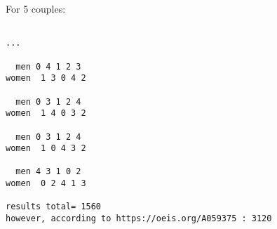 For 5 couples:

\begin{lstlisting}

...

  men 0 4 1 2 3
women  1 3 0 4 2

  men 0 3 1 2 4
women  1 4 0 3 2

  men 0 3 1 2 4
women  1 0 4 3 2

  men 4 3 1 0 2
women  0 2 4 1 3

results total= 1560
however, according to https://oeis.org/A059375 : 3120
\end{lstlisting}

